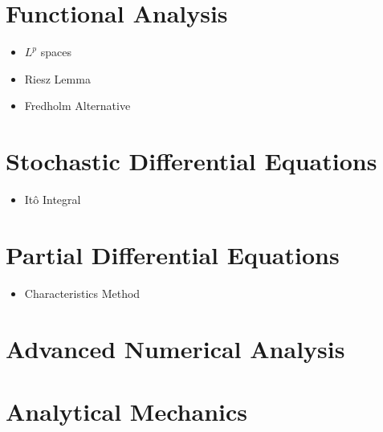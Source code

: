 \documentclass[10pt]{article}
\begin{document}
\section{Functional Analysis}
\begin{refsection}

\begin{itemize}
	\item $ L^p $ spaces
	\item Riesz Lemma
	\item Fredholm Alternative
\end{itemize}

\nocite{brezis2010functional}
\printbibliography[heading=subbibliography]
\end{refsection}

\section{Stochastic Differential Equations}
\begin{itemize}
	\item It\^o Integral
	\end{itemize}
\section{Partial Differential Equations}
\begin{itemize}
	\item Characteristics Method
\end{itemize}
\begin{refsection}
	\nocite{salsa2016equazioni}
	\nocite{salsa2016partial}
\printbibliography[heading=subbibliography]
\end{refsection}
\section{Advanced Numerical Analysis}
\section{Analytical Mechanics}
\end{document}
